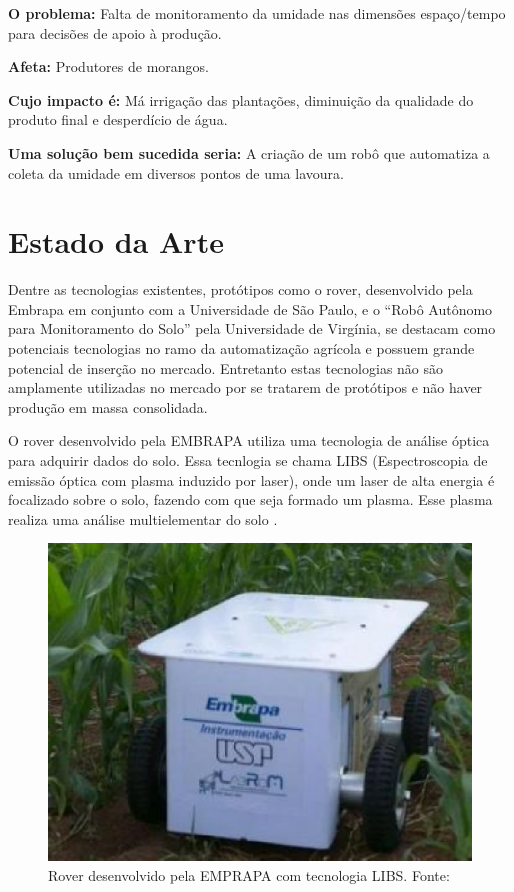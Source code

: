   \textbf{O problema:} Falta de monitoramento da umidade nas dimensões espaço/tempo
  para decisões de apoio à produção.

  \textbf{Afeta:} Produtores de morangos.

  \textbf{Cujo impacto é:} Má irrigação das plantações, diminuição da qualidade
  do produto final e desperdício de água.

  \textbf{Uma solução bem sucedida seria:} A criação de um robô que automatiza
  a coleta da umidade em diversos pontos de uma lavoura.

  \vfill
  \pagebreak

  \section{Estado da Arte}

  Dentre as tecnologias existentes, protótipos como o rover, desenvolvido pela
  Embrapa em conjunto com a Universidade de São Paulo, e o “Robô Autônomo para
  Monitoramento do Solo” pela Universidade de Virgínia, se destacam como
  potenciais tecnologias no ramo da automatização agrícola e possuem grande
  potencial de inserção no mercado.  Entretanto estas tecnologias não são
  amplamente utilizadas no mercado por se tratarem de protótipos e não haver
  produção em massa consolidada.

  O rover desenvolvido pela EMBRAPA utiliza uma tecnologia de análise óptica
  para adquirir dados do solo. Essa tecnlogia se chama LIBS (Espectroscopia de
  emissão óptica com plasma induzido por laser), onde um laser de alta energia
  é focalizado sobre o solo, fazendo com que seja formado um plasma.
  Esse plasma realiza uma análise multielementar do solo \cite{ARCHILA2014}.

  \begin{figure}[h]
    \centering
    \label{fig01}
      \includegraphics[keepaspectratio=true,scale=0.5]{figuras/fig02.eps}
    \caption{Rover desenvolvido pela EMPRAPA com tecnologia LIBS. Fonte: \cite{ARCHILA2014}}
  \end{figure}

